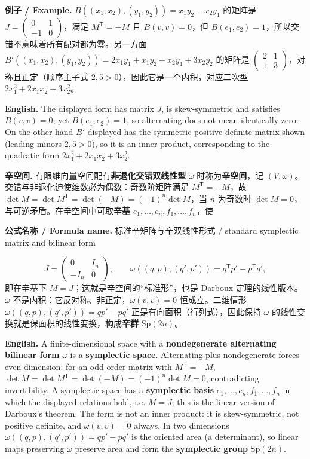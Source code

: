 \documentclass[UTF8,11pt,a4paper]{ctexart}
\newcommand{\EN}[1]{\par\noindent\textbf{English.} #1\par}
\newcommand{\FORMULA}[2]{\par\noindent\textbf{公式名称 / Formula name.} #1 / #2\par}
\newcommand{\EX}[2]{\par\noindent\textbf{例子 / Example.} #1\par\EN{#2}}
\begin{document}
\EX{$B((x_1,x_2),(y_1,y_2))=x_1y_2-x_2y_1$ 的矩阵是 $J=\begin{pmatrix}0&1\\-1&0\end{pmatrix}$，满足 $M^{\mathsf T}=-M$ 且 $B(v,v)=0$，但 $B(e_1,e_2)=1$，所以交错不意味着所有配对都为零。另一方面 $B'((x_1,x_2),(y_1,y_2))=2x_1y_1+x_1y_2+x_2y_1+3x_2y_2$ 的矩阵是 $\begin{pmatrix}2&1\\1&3\end{pmatrix}$，对称且正定（顺序主子式 $2,5>0$），因此它是一个内积，对应二次型 $2x_1^2+2x_1x_2+3x_2^2$。}{The displayed form has matrix $J$, is skew-symmetric and satisfies $B(v,v)=0$, yet $B(e_1,e_2)=1$, so alternating does not mean identically zero. On the other hand $B'$ displayed has the symmetric positive definite matrix shown (leading minors $2,5>0$), so it is an inner product, corresponding to the quadratic form $2x_1^2+2x_1x_2+3x_2^2$.}
\noindent\textbf{辛空间.} 有限维向量空间配有\textbf{非退化交错双线性型} $\omega$ 时称为\textbf{辛空间}，记 $(V,\omega)$。交错与非退化迫使维数必为偶数：奇数阶矩阵满足 $M^{\mathsf T}=-M$，故 $\det M=\det M^{\mathsf T}=\det(-M)=(-1)^n\det M$，当 $n$ 为奇数时 $\det M=0$，与可逆矛盾。在辛空间中可取\textbf{辛基} $e_1,\dots,e_n,f_1,\dots,f_n$，使
\FORMULA{标准辛矩阵与辛双线性形式}{standard symplectic matrix and bilinear form}
\[
J=\begin{pmatrix}0&I_n\\-I_n&0\end{pmatrix},\qquad
\omega((q,p),(q',p'))=q^{\mathsf T}p'-p^{\mathsf T}q',
\]
即在辛基下 $M=J$；这就是辛空间的“标准形”，也是 Darboux 定理的线性版本。$\omega$ 不是内积：它反对称、非正定，$\omega(v,v)=0$ 恒成立。二维情形 $\omega((q,p),(q',p'))=qp'-pq'$ 正是有向面积（行列式），因此保持 $\omega$ 的线性变换就是保面积的线性变换，构成\textbf{辛群} $\mathrm{Sp}(2n)$。
\EN{A finite-dimensional space with a \textbf{nondegenerate alternating bilinear form} $\omega$ is a \textbf{symplectic space}. Alternating plus nondegenerate forces even dimension: for an odd-order matrix with $M^{\mathsf T}=-M$, $\det M=\det M^{\mathsf T}=\det(-M)=(-1)^n\det M=0$, contradicting invertibility. A symplectic space has a \textbf{symplectic basis} $e_1,\dots,e_n,f_1,\dots,f_n$ in which the displayed relations hold, i.e. $M=J$; this is the linear version of Darboux's theorem. The form is not an inner product: it is skew-symmetric, not positive definite, and $\omega(v,v)=0$ always. In two dimensions $\omega((q,p),(q',p'))=qp'-pq'$ is the oriented area (a determinant), so linear maps preserving $\omega$ preserve area and form the \textbf{symplectic group} $\mathrm{Sp}(2n)$.}
\end{document}
